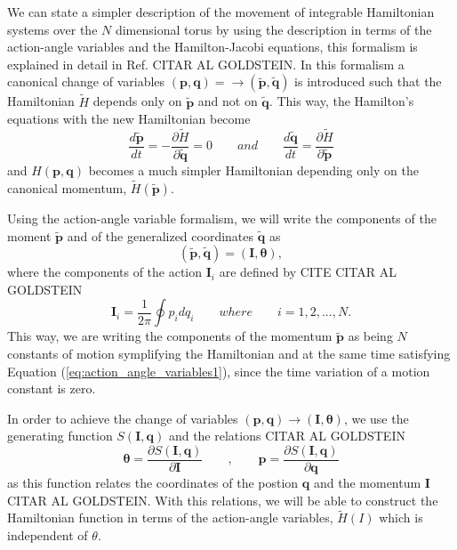 We can state a simpler description of the movement of integrable Hamiltonian systems over the $N$ dimensional torus by using the description in terms of the action-angle variables and the Hamilton-Jacobi equations, this formalism is explained in detail in Ref. CITAR AL GOLDSTEIN. In this formalism a canonical change of variables $(\bm{p},\bm{q})=\rightarrow (\tilde{\bm{p}},\tilde{\bm{q}})$ is introduced such that the Hamiltonian $\tilde{H}$ depends only on $\tilde{\bm{p}}$ and not on $\tilde{\bm{q}}$. This way, the Hamilton's equations with the new Hamiltonian become
\begin{equation}
\frac{d\tilde{\bm{p}}}{dt}= -\frac{\partial \tilde{H}}{\partial \tilde{\bm{q}}}=0  \qquad and \qquad  
\frac{d\tilde{\bm{q}}}{dt}= \frac{\partial \tilde{H}}{\partial \tilde{\bm{p}}}
\label{eq:action_angle_variables1}
\end{equation}
and $H(\bm{p},\bm{q})$ becomes a much simpler Hamiltonian depending only on the canonical momentum, $\tilde{H}(\tilde{\bm{p}})$.\par


Using the action-angle variable formalism, we will write the components of the moment $\tilde{\bm{p}}$ and of the generalized coordinates $\tilde{\bm{q}}$ as
\begin{equation}
(\tilde{\bm{p}},\tilde{\bm{q}})=(\bm{I},\bm{\theta}),
\end{equation}
where the components of the action $\bm{I}_i$ are defined by CITE CITAR AL GOLDSTEIN
\begin{equation}
\bm{I}_i=\frac{1}{2\pi}\oint p_idq_i \qquad where \qquad i=1,2,...,N.
\end{equation}
This way, we are writing the components of the momentum $\tilde{\bm{p}}$ as being $N$ constants of motion  symplifying the Hamiltonian and at the same time satisfying Equation (\ref{eq:action_angle_variables1}), since the time variation of a motion constant is zero.\par

In order to achieve the change of variables $(\bm{p},\bm{q})\rightarrow (\bm{I},\bm{\theta})$, we use the generating function $S(\bm{I},\bm{q})$ and the relations CITAR AL GOLDSTEIN
\begin{equation}
\bm{\theta}=\frac{\partial S(\bm{I},\bm{q})}{\partial \bm{I}} \qquad ,\qquad \bm{p}=\frac{\partial S(\bm{I},\bm{q})}{\partial \bm{q}}
\end{equation}
as this function relates the  coordinates of the postion $\bm{q}$ and the  momentum $\bm{I}$ CITAR AL GOLDSTEIN. With this relations, we will be able to construct the Hamiltonian function in terms of the action-angle variables, $\tilde{H}(I)$ which is independent of $\theta$.\par

